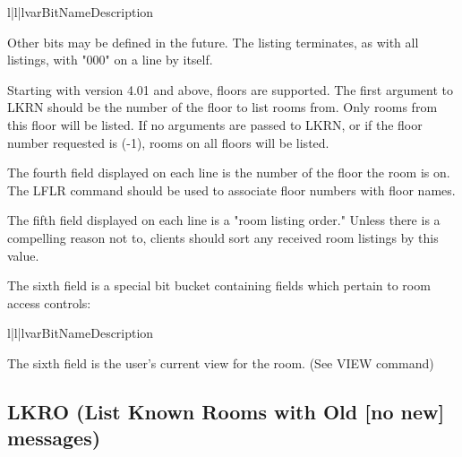 \begin{tableiii}{l|l|l}{var}{Bit}{Name}{Description}



\end{tableiii}



 Other bits may be defined in the future.  The listing terminates, as with
all listings, with "000" on a line by itself.

 Starting with version 4.01 and above, floors are supported.  The first
argument to LKRN should be the number of the floor to list rooms from.  Only
rooms from this floor will be listed.  If no arguments are passed to LKRN, or
if the floor number requested is (-1), rooms on all floors will be listed.

 The fourth field displayed on each line is the number of the floor the room
is on.  The LFLR command should be used to associate floor numbers with
floor names.

 The fifth field displayed on each line is a "room listing order."  Unless
there is a compelling reason not to, clients should sort any received room
listings by this value.

 The sixth field is a special bit bucket containing fields which pertain to
room access controls:

\begin{tableiii}{l|l|l}{var}{Bit}{Name}{Description}





\end{tableiii}


 The sixth field is the user's current view for the room. (See VIEW command)



\subsection{LKRO (List Known Rooms with Old [no new] messages)}


